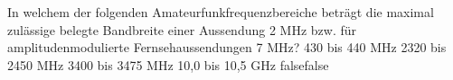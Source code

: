     {In welchem der folgenden Amateurfunkfrequenzbereiche beträgt die maximal zulässige belegte Bandbreite einer Aussendung 2 MHz bzw. für amplitudenmodulierte Fernsehaussendungen 7 MHz?}
    {430 bis 440 MHz}
    {2320 bis 2450 MHz}
    {3400 bis 3475 MHz}
    {10,0 bis 10,5 GHz}
    {false}{false}